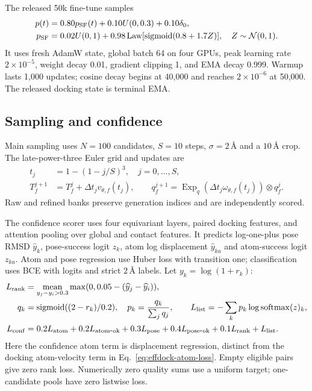 The released 50k fine-tune samples
\begin{align}
 p(t)&=0.80p_{\rm SF}(t)+0.10U(0,0.3)+0.10\delta_0,\\
 p_{\rm SF}&=0.02U(0,1)+0.98\operatorname{Law}
 [\operatorname{sigmoid}(0.8+1.7Z)],\quad Z\sim\mathcal N(0,1).
\end{align}
It uses fresh AdamW state, global batch 64 on four GPUs, peak learning rate
$2\times10^{-5}$, weight decay 0.01, gradient clipping 1, and EMA decay 0.999.
Warmup lasts 1,000 updates; cosine decay begins at 40,000 and reaches
$2\times10^{-6}$ at 50,000. The released docking state is terminal EMA.

\subsection{Sampling and confidence}
Main sampling uses $N=100$ candidates, $S=10$ steps, $\sigma=2\,\text{\AA}$
and a $10\,\text{\AA}$ crop. The late-power-three Euler grid and updates are
\begin{align}
 t_j&=1-(1-j/S)^3,\quad j=0,\ldots,S,\\
 T_f^{j+1}&=T_f^j+\Delta t_jv_{\theta,f}(t_j),\qquad
 q_f^{j+1}=\operatorname{Exp}_q(\Delta t_j\omega_{\theta,f}(t_j))\otimes q_f^j.
 \label{eq:effdock-sampler}
\end{align}
Raw and refined banks preserve generation indices and are independently scored.

The confidence scorer uses four equivariant layers, paired docking features,
and attention pooling over global and contact features. It predicts log-one-plus pose
RMSD $\widehat y_k$, pose-success logit $z_k$, atom log displacement
$\widehat y_{ka}$ and atom-success logit $z_{ka}$. Atom and pose regression
use Huber loss with transition one; classification uses BCE with logits and
strict $2\,\text{\AA}$ labels. Let $y_k=\log(1+r_k)$:
\begin{align}
 L_{\rm rank}&=\underset{y_j-y_i>0.3}{\operatorname{mean}}
 \max(0,0.05-(\widehat y_j-\widehat y_i)),\\
 q_k&=\operatorname{sigmoid}((2-r_k)/0.2),\quad
 p_k=\frac{q_k}{\sum_jq_j},\qquad
 L_{\rm list}=-\sum_kp_k\log\operatorname{softmax}(z)_k,\\
 L_{\rm conf}&=0.2L_{\rm atom}+0.2L_{\rm atom\mbox{-}ok}
 +0.3L_{\rm pose}+0.4L_{\rm pose\mbox{-}ok}
 +0.1L_{\rm rank}+L_{\rm list}.
 \label{eq:effdock-confidence}
\end{align}
Here the confidence atom term is displacement regression, distinct from the
docking atom-velocity term in Eq.~\ref{eq:effdock-atom-loss}. Empty eligible
pairs give zero rank loss. Numerically zero quality sums use a uniform target;
one-candidate pools have zero listwise loss.


